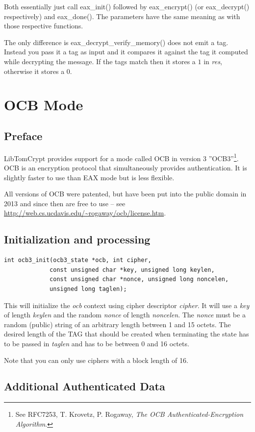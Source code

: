 \documentclass[synpaper]{book}
\newcommand{\mysection}[1]    %
	{                   %
	\section{#1}
   \markboth{\textsf{www.libtom.net}}{\thesection ~ {#1}}
	}
\begin{document}
Both essentially just call eax\_init() followed by eax\_encrypt() (or eax\_decrypt() respectively) and eax\_done().  The parameters
have the same meaning as with those respective functions.

The only difference is eax\_decrypt\_verify\_memory() does not emit a tag.  Instead you pass it a tag as input and it compares it against
the tag it computed while decrypting the message.  If the tags match then it stores a $1$ in \textit{res}, otherwise it stores a $0$.

\mysection{OCB Mode}
\subsection{Preface}

LibTomCrypt provides support for a mode called OCB in version 3
''OCB3''\footnote{See RFC7253, T. Krovetz, P. Rogaway, \textit{The OCB Authenticated-Encryption Algorithm}.}.
OCB is an encryption protocol that simultaneously provides authentication.  It is slightly faster to use than EAX mode
but is less flexible.

All versions of OCB were patented, but have been put into the public domain in 2013 and since then are free to use
-- see \url{http://web.cs.ucdavis.edu/~rogaway/ocb/license.htm}.

\subsection{Initialization and processing}

\begin{verbatim}
int ocb3_init(ocb3_state *ocb, int cipher,
             const unsigned char *key, unsigned long keylen,
             const unsigned char *nonce, unsigned long noncelen,
             unsigned long taglen);
\end{verbatim}

This will initialize the \textit{ocb} context using cipher descriptor \textit{cipher}.  It will use a \textit{key} of length \textit{keylen}
and the random \textit{nonce} of length \textit{noncelen}.  The \textit{nonce} must be a random (public) string of an arbitrary length
between 1 and 15 octets.  The desired length of the TAG that should be created when terminating the state has to be passed in \textit{taglen}
and has to be between 0 and 16 octets.

Note that you can only use ciphers with a block length of 16.

\subsection{Additional Authenticated Data}
\end{document}
